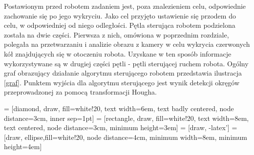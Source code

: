 Postawionym przed robotem zadaniem jest, poza znalezieniem celu, odpowiednie zachowanie się po jego wykryciu. Jako cel przyjęto ustawienie się przodem do celu, w odpowiedniej od niego odległości. Pętla sterująca robotem podzielona została na dwie części. Pierwsza z nich, omówiona w poprzednim rozdziale, polegała na przetwarzaniu i analizie obrazu z kamery w celu wykrycia czerwonych kół znajdujących się w otoczeniu robota. Uzyskane w ten sposób informacje wykorzystywane są w drugiej części pętli - pętli sterującej ruchem robota. Ogólny graf obrazujący działanie algorytmu sterującego robotem przedstawia ilustracja \ref{graf}. Punktem wyjścia dla algorytmu sterującego jest wynik detekcji okręgów przeprowadzonej za pomocą transformacji Hougha.

 = [diamond, draw, fill=white!20, 
    text width=6em, text badly centered, node distance=3cm, inner sep=1pt]
 = [rectangle, draw, fill=white!20, 
    text width=8em, text centered, node distance=3cm, minimum height=3em]
 = [draw, -latex']
 = [draw, ellipse,fill=white!20, node distance=4cm,
    minimum width=8em, minimum height=4em]
    
